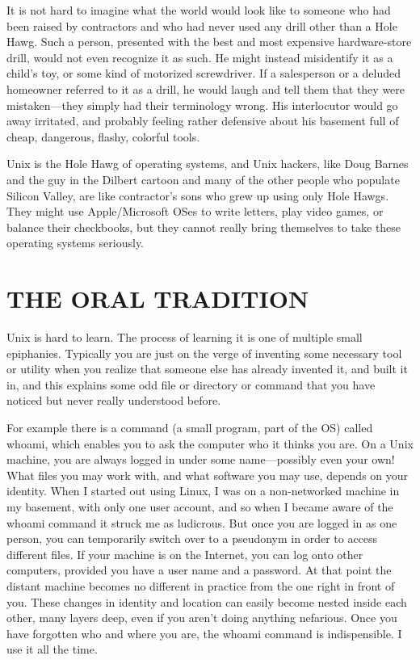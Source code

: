 \documentclass[
  fontsize=11pt,
  paper=landscape,
  twocolumn=true,
  pagesize=pdftex,
  headings=small,
  DIV=15,
  ]{scrartcl}
\begin{document}
It is not hard to imagine what the world would look like to someone who
had been raised by contractors and who had never used any drill other
than a Hole Hawg. Such a person, presented with the best and most
expensive hardware-store drill, would not even recognize it as such. He
might instead misidentify it as a child's toy, or some kind of motorized
screwdriver. If a salesperson or a deluded homeowner referred to it as a
drill, he would laugh and tell them that they were mistaken---they
simply had their terminology wrong. His interlocutor would go away
irritated, and probably feeling rather defensive about his basement full
of cheap, dangerous, flashy, colorful tools.

Unix is the Hole Hawg of operating systems, and Unix hackers, like Doug
Barnes and the guy in the Dilbert cartoon and many of the other people
who populate Silicon Valley, are like contractor's sons who grew up
using only Hole Hawgs. They might use Apple/Microsoft OSes to write
letters, play video games, or balance their checkbooks, but they cannot
really bring themselves to take these operating systems seriously.

\section{THE ORAL TRADITION}

Unix is hard to learn. The process of learning it is one of multiple
small epiphanies. Typically you are just on the verge of inventing some
necessary tool or utility when you realize that someone else has already
invented it, and built it in, and this explains some odd file or
directory or command that you have noticed but never really understood
before.

For example there is a command (a small program, part of the OS) called
whoami, which enables you to ask the computer who it thinks you are. On
a Unix machine, you are always logged in under some name---possibly even
your own! What files you may work with, and what software you may use,
depends on your identity. When I started out using Linux, I was on a
non-networked machine in my basement, with only one user account, and so
when I became aware of the whoami command it struck me as ludicrous. But
once you are logged in as one person, you can temporarily switch over to
a pseudonym in order to access different files. If your machine is on
the Internet, you can log onto other computers, provided you have a user
name and a password. At that point the distant machine becomes no
different in practice from the one right in front of you. These changes
in identity and location can easily become nested inside each other,
many layers deep, even if you aren't doing anything nefarious. Once you
have forgotten who and where you are, the whoami command is
indispensible. I use it all the time.
\end{document}
